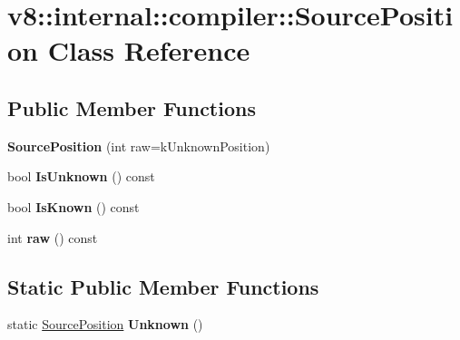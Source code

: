 \hypertarget{classv8_1_1internal_1_1compiler_1_1_source_position}{}\section{v8\+:\+:internal\+:\+:compiler\+:\+:Source\+Position Class Reference}
\label{classv8_1_1internal_1_1compiler_1_1_source_position}
\subsection*{Public Member Functions}
\begin{DoxyCompactItemize}
\item 
{\bfseries Source\+Position} (int raw=k\+Unknown\+Position)\hypertarget{classv8_1_1internal_1_1compiler_1_1_source_position_ab019cd7b0afd28e5135a7e0f6d81d572}{}\label{classv8_1_1internal_1_1compiler_1_1_source_position_ab019cd7b0afd28e5135a7e0f6d81d572}

\item 
bool {\bfseries Is\+Unknown} () const \hypertarget{classv8_1_1internal_1_1compiler_1_1_source_position_aee32a4fa30e8c563fa691b62427afa1b}{}\label{classv8_1_1internal_1_1compiler_1_1_source_position_aee32a4fa30e8c563fa691b62427afa1b}

\item 
bool {\bfseries Is\+Known} () const \hypertarget{classv8_1_1internal_1_1compiler_1_1_source_position_a899840fcf3f54f88e49d51134f1b8859}{}\label{classv8_1_1internal_1_1compiler_1_1_source_position_a899840fcf3f54f88e49d51134f1b8859}

\item 
int {\bfseries raw} () const \hypertarget{classv8_1_1internal_1_1compiler_1_1_source_position_aa01ac16a8dd01fe90e98d3a81d67f4b9}{}\label{classv8_1_1internal_1_1compiler_1_1_source_position_aa01ac16a8dd01fe90e98d3a81d67f4b9}

\end{DoxyCompactItemize}
\subsection*{Static Public Member Functions}
\begin{DoxyCompactItemize}
\item 
static \hyperlink{classv8_1_1internal_1_1compiler_1_1_source_position}{Source\+Position} {\bfseries Unknown} ()\hypertarget{classv8_1_1internal_1_1compiler_1_1_source_position_a4659081c75c4b6cdc1e1fc706f3f715d}{}\label{classv8_1_1internal_1_1compiler_1_1_source_position_a4659081c75c4b6cdc1e1fc706f3f715d}

\end{DoxyCompactItemize}
